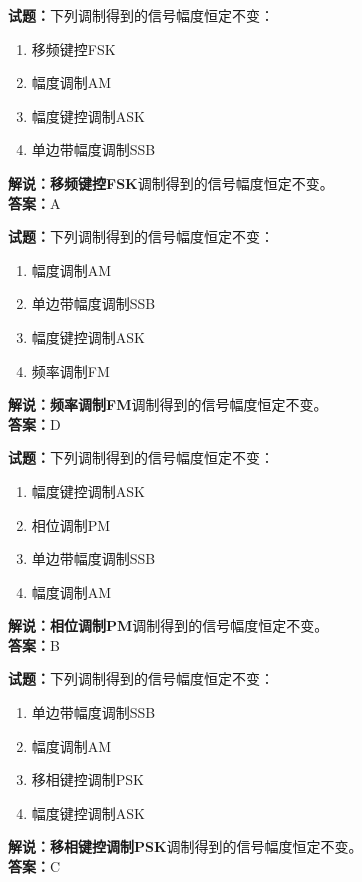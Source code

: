 \documentclass{ctexbook}
\begin{document}
\bigskip


\noindent\textbf{试题：}下列调制得到的信号幅度恒定不变：
\begin{enumerate}[leftmargin=3em]
\item 移频键控FSK
\item 幅度调制AM
\item 幅度键控调制ASK
\item 单边带幅度调制SSB
\end{enumerate}
\noindent\textbf{解说：}\textbf{移频键控FSK}调制得到的信号幅度恒定不变。\\\noindent\textbf{答案：}A




\bigskip


\noindent\textbf{试题：}下列调制得到的信号幅度恒定不变：
\begin{enumerate}[leftmargin=3em]
\item 幅度调制AM
\item 单边带幅度调制SSB
\item 幅度键控调制ASK
\item 频率调制FM
\end{enumerate}
\noindent\textbf{解说：}\textbf{频率调制FM}调制得到的信号幅度恒定不变。\\\noindent\textbf{答案：}D




\bigskip


\noindent\textbf{试题：}下列调制得到的信号幅度恒定不变：
\begin{enumerate}[leftmargin=3em]
\item 幅度键控调制ASK
\item 相位调制PM
\item 单边带幅度调制SSB
\item 幅度调制AM
\end{enumerate}
\noindent\textbf{解说：}\textbf{相位调制PM}调制得到的信号幅度恒定不变。\\\noindent\textbf{答案：}B



\bigskip


\noindent\textbf{试题：}下列调制得到的信号幅度恒定不变：
\begin{enumerate}[leftmargin=3em]
\item 单边带幅度调制SSB
\item 幅度调制AM
\item 移相键控调制PSK
\item 幅度键控调制ASK
\end{enumerate}
\noindent\textbf{解说：}\textbf{移相键控调制PSK}调制得到的信号幅度恒定不变。\\\noindent\textbf{答案：}C
\end{document}
